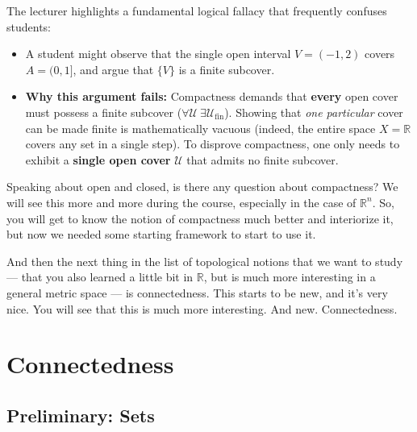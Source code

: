 \begin{content}[{Non-Compactness of the Half-Open Interval \texorpdfstring{$(0, 1]
\begin{steps}
The lecturer highlights a fundamental logical fallacy that frequently confuses students:
\begin{itemize}
    \item A student might observe that the single open interval $V = (-1, 2)$ covers $A = (0, 1]$, and argue that $\{V\}$ is a finite subcover.
    \item \textbf{Why this argument fails:} Compactness demands that \textbf{every} open cover must possess a finite subcover ($\forall \mathcal{U} \ \exists \mathcal{U}_{\text{fin}}$). Showing that \emph{one particular} cover can be made finite is mathematically vacuous (indeed, the entire space $X = \mathbb{R}$ covers any set in a single step). To disprove compactness, one only needs to exhibit a \textbf{single open cover} $\mathcal{U}$ that admits no finite subcover.
\end{itemize}
\end{steps}
\end{content}

\begin{speech}[01:11:26 - 01:12:47]
Speaking about open and closed, is there any question about compactness? We will see this more and more during the course, especially in the case of $\mathbb{R}^n$. So, you will get to know the notion of compactness much better and interiorize it, but now we needed some starting framework to start to use it.

And then the next thing in the list of topological notions that we want to study --- that you also learned a little bit in $\mathbb{R}$, but is much more interesting in a general metric space --- is connectedness. This starts to be new, and it's very nice. You will see that this is much more interesting. And new. Connectedness.
\end{speech}

\section{Connectedness}

\subsection{Preliminary: \texorpdfstring{}{Clopen} Sets}

